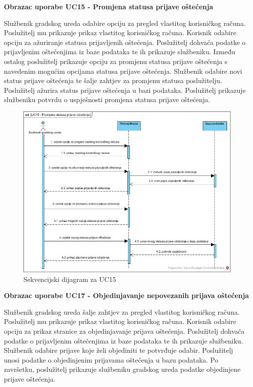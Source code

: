 \noindent \textbf{Obrazac uporabe UC15 - Promjena statusa prijave oštećenja}

Službenik gradskog ureda odabire opciju za pregled vlastitog korisničkog računa. Poslužitelj mu prikazuje prikaz vlastitog korisničkog računa. 
Korisnik odabire opciju za ažuriranje statusa prijavljenih oštećenja. Poslužitelj dohvaća podatke o prijavljenim oštećenjima iz baze
podataka te ih prikazuje službeniku. Između ostalog poslužitelj prikazuje opciju za promjenu statusa prijave oštećenja s navedenim mogućim 
opcijama statusa prijave oštećenja. Službenik odabire novi status prijave oštećenja te šalje zahtjev za promjenu statusa poslužitelju. 
Poslužitelj ažurira status prijave oštećenja u bazi podataka. Poslužitelj prikazuje službeniku potvrdu o uspješnosti promjena statusa prijave oštećenja.

\begin{figure}[H]
	\includegraphics[scale=0.5]{slike/UC15_sekvencijski.jpg} %
	\centering
	\caption{Sekvencijski dijagram za UC15}
	\label{fig:SekvencijskiDijagramPromjenaStatusaPrijaveOštećenja}
\end{figure}

\noindent \textbf{Obrazac uporabe UC17 - Objedinjavanje nepovezanih prijava oštećenja}

Službenik gradskog ureda šalje zahtjev za pregled vlastitog korisničkog računa. Poslužitelj mu prikazuje prikaz vlastitog korisničkog računa.
Korisnik odabire opciju za prikaz stranice za objedinjavanje prijava oštećenja. Poslužitelj dohvaća podatke o prijavljenim oštećenjima iz baze 
podataka te ih prikazuje službeniku. Službenik odabire prijave koje želi objediniti te potvrđuje odabir. Poslužitelj unosi podatke o 
objedinjenim prijavama oštećenja u bazu podataka. Po završetku, poslužitelj prikazuje službeniku gradskog ureda podatke objedinjene prijave oštećenja. 


